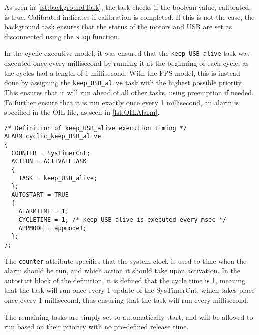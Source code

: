 As seen in \autoref{lst:backgroundTask}, the task checks if the boolean value, calibrated, is true.
Calibrated indicates if calibration is completed.
If this is not the case, the background task ensures that the status of the motors and USB are set as disconnected using the \texttt{stop} function.

In the cyclic executive model, it was ensured that the \texttt{keep\_USB\_alive} task was executed once every millisecond by running it at the beginning of each cycle, as the cycles had a length of 1 millisecond.
With the FPS model, this is instead done by assigning the \texttt{keep\_USB\_alive} task with the highest possible priority.
This ensures that it will run ahead of all other tasks, using preemption if needed.
To further ensure that it is run exactly once every 1 millisecond, an alarm is specified in the OIL file, as seen in \autoref{lst:OILAlarm}.

\begin{lstlisting}[language=CSharp,label={lst:OILAlarm},caption={Alarm in the OIL}]
/* Definition of keep_USB_alive execution timing */
ALARM cyclic_keep_USB_alive
{
  COUNTER = SysTimerCnt;
  ACTION = ACTIVATETASK
  {
    TASK = keep_USB_alive;
  };
  AUTOSTART = TRUE
  {
    ALARMTIME = 1;
    CYCLETIME = 1; /* keep_USB_alive is executed every msec */
    APPMODE = appmode1;
  };
};
\end{lstlisting}

The \texttt{counter} attribute specifies that the system clock is used to time when the alarm should be run, and which action it should take upon activation.
In the autostart block of the definition, it is defined that the cycle time is 1, meaning that the task will run once every 1 update of the SysTimerCnt, which takes place once every 1 millisecond, thus ensuring that the task will run every millisecond.

The remaining tasks are simply set to automatically start, and will be allowed to run based on their priority with no pre-defined release time.
